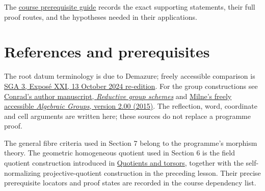 \documentclass[11pt,a4paper,openany]{report}
\begin{document}
The \href{prerequisites.html}{course prerequisite guide} records the exact supporting statements, their full proof routes, and the hypotheses needed in their applications.

\section{References and prerequisites}\label{AG-RG-04-references-and-prerequisites}

The root datum terminology is due to Demazure; freely accessible comparison is \href{https://webusers.imj-prg.fr/~patrick.polo/SGA3/Exp21-13oct24.pdf}{SGA 3, Exposé XXI, 13 October 2024 re-edition}. For the group constructions see \href{https://math.stanford.edu/~conrad/papers/luminysga3.pdf}{Conrad's author manuscript, \emph{Reductive group schemes}} and \href{https://www.jmilne.org/math/CourseNotes/iAG200.pdf}{Milne's freely accessible \emph{Algebraic Groups}, version 2.00 (2015)}. The reflection, word, coordinate and cell arguments are written here; these sources do not replace a programme proof.

The general fibre criteria used in Section 7 belong to the programme's morphism theory. The geometric homogeneous quotient used in Section 6 is the field quotient construction introduced in \href{https://github.com/KokunoYumeto/open-math-courses/blob/main/docs/courses/AG-GS/AG-GS-04.html}{Quotients and torsors}, together with the self-normalizing projective-quotient construction in the preceding lesson. Their precise prerequisite locators and proof states are recorded in the course dependency list.
\end{document}
